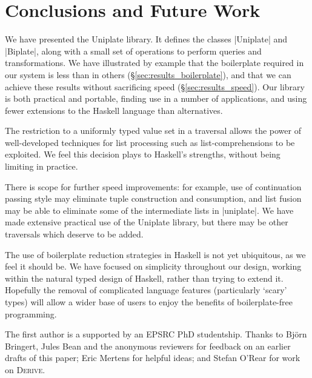 \documentclass[preprint]{sigplanconf}
\newcommand{\derive}{\textsc{Derive}}
\begin{document}
\section{Conclusions and Future Work}
\label{sec:conclusion}

We have presented the Uniplate library. It defines the classes |Uniplate| and |Biplate|, along with a small set of operations to perform queries and transformations. We have illustrated by example that the boilerplate required in our system is less than in others (\S\ref{sec:results_boilerplate}), and that we can achieve these results without sacrificing speed (\S\ref{sec:results_speed}). Our library is both practical and portable, finding use in a number of applications, and using fewer extensions to the Haskell language than alternatives.

The restriction to a uniformly typed value set in a traversal allows the power of well-developed techniques for list processing such as list-comprehensions to be exploited. We feel this decision plays to Haskell's strengths, without being limiting in practice.

There is scope for further speed improvements: for example, use of continuation passing style may eliminate tuple construction and consumption, and list fusion may be able to eliminate some of the intermediate lists in |uniplate|. We have made extensive practical use of the Uniplate library, but there may be other traversals which deserve to be added.

The use of boilerplate reduction strategies in Haskell is not yet ubiquitous, as we feel it should be. We have focused on simplicity throughout our design, working within the natural typed design of Haskell, rather than trying to extend it. Hopefully the removal of complicated language features (particularly `scary' types) will allow a wider base of users to enjoy the benefits of boilerplate-free programming.

\acks

The first author is a supported by an EPSRC PhD studentship. Thanks to Bj\"{o}rn Bringert, Jules Bean and the anonymous reviewers for feedback on an earlier drafts of this paper; Eric Mertens for helpful ideas; and Stefan O'Rear for work on \derive{}.




\end{document}
